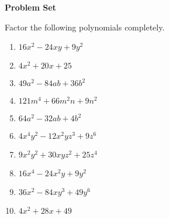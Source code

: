 \textbf{Problem Set}

\vspce

Factor the following polynomials completely.  
\begin{enumerate} 
%

\item \hspce $16x^{2} - 24xy + 9y^{2} $
\item \hspce $4x^{2} + 20x + 25$
\item \hspce $49a^{2} - 84ab + 36b^{2}$
\item \hspce $121m^{4} + 66m^{2}n + 9n^{2}$
\item \hspce $64a^{2} - 32ab + 4b^{2}$
\item \hspce $4 x^{4} y^{2} - 12 x^{2} y z^{3} + 9 z^{6}$
\item \hspce $9 x^{2} y^{2} + 30 x y z^{2} + 25 z^{4}$
\item \hspce $16 x^{4} - 24 x^{2} y + 9 y^{2}$
\item \hspce $36 x^{2} - 84 x y^{3} + 49 y^{6}$
\item \hspce $4 x^{2} + 28 x + 49$

% 
\end{enumerate}
